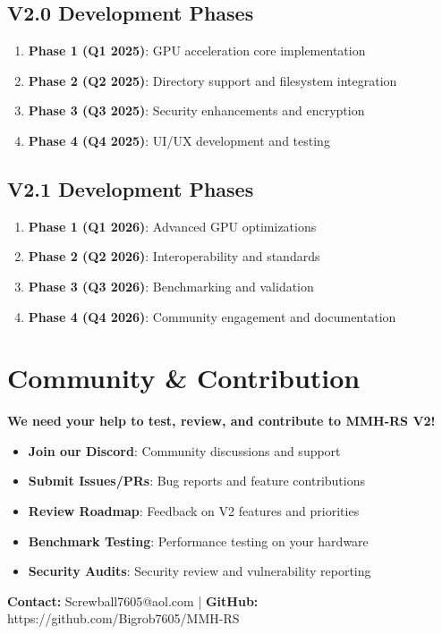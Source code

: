\documentclass[12pt,a4paper]{article}
\makeatletter
\newcommand{\email}{Screwball7605@aol.com}
\newcommand{\github}{https://github.com/Bigrob7605/MMH-RS}
\makeatother
\begin{document}
\subsection{V2.0 Development Phases}
\begin{enumerate}
    \item \textbf{Phase 1 (Q1 2025)}: GPU acceleration core implementation
    \item \textbf{Phase 2 (Q2 2025)}: Directory support and filesystem integration
    \item \textbf{Phase 3 (Q3 2025)}: Security enhancements and encryption
    \item \textbf{Phase 4 (Q4 2025)}: UI/UX development and testing
\end{enumerate}

\subsection{V2.1 Development Phases}
\begin{enumerate}
    \item \textbf{Phase 1 (Q1 2026)}: Advanced GPU optimizations
    \item \textbf{Phase 2 (Q2 2026)}: Interoperability and standards
    \item \textbf{Phase 3 (Q3 2026)}: Benchmarking and validation
    \item \textbf{Phase 4 (Q4 2026)}: Community engagement and documentation
\end{enumerate}

\section{Community \& Contribution}

\begin{tcolorbox}[colback=orange!10,colframe=orange!50,title=\textbf{Help Us Build MMH-RS V2}]
\textbf{We need your help to test, review, and contribute to MMH-RS V2!}

\begin{itemize}
    \item \textbf{Join our Discord}: Community discussions and support
    \item \textbf{Submit Issues/PRs}: Bug reports and feature contributions
    \item \textbf{Review Roadmap}: Feedback on V2 features and priorities
    \item \textbf{Benchmark Testing}: Performance testing on your hardware
    \item \textbf{Security Audits}: Security review and vulnerability reporting
\end{itemize}

\textbf{Contact:} \email{} | \textbf{GitHub:} \github
\end{tcolorbox}
\end{document}
